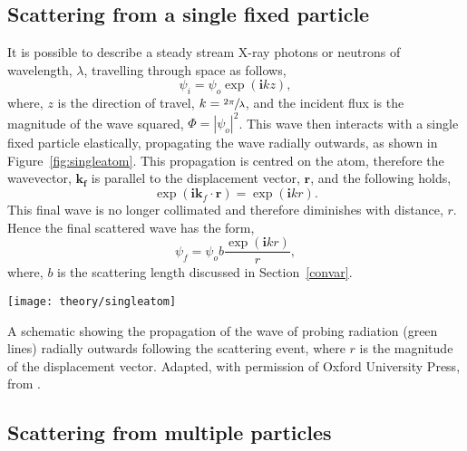 \subsection{Scattering from a single fixed particle}
It is possible to describe a steady stream X-ray photons or neutrons of wavelength, $\lambda$, travelling through space as follows,
%
\begin{equation}
    \psi_i = \psi_o \exp{(\mathbf{i} kz)},
    \label{equ:wave}
\end{equation}
%
where, $z$ is the direction of travel, $k=\sfrac{2\pi}{\lambda}$, and the incident flux is the magnitude of the wave squared, $\Phi = |\psi_o|^2$.
This wave then interacts with a single fixed particle elastically, propagating the wave radially outwards, as shown in Figure~\ref{fig:singleatom}.
This propagation is centred on the atom, therefore the wavevector, $\mathbf{k_f}$ is parallel to the displacement vector, $\mathbf{r}$, and the following holds,
%
\begin{equation}
    \exp{(\mathbf{i}\mathbf{k}_f\cdot \mathbf{r})} = \exp{(\mathbf{i}kr)}.
\end{equation}
%
This final wave is no longer collimated and therefore diminishes with distance, $r$.
Hence the final scattered wave has the form,
%
\begin{equation}
    \psi_f = \psi_o b\frac{\exp{(\mathbf{i}kr)}}{r},
\end{equation}
%
where, $b$ is the scattering length discussed in Section~\ref{convar}.
%
\begin{marginfigure}
    \centering
    \texttt{[image: theory/singleatom]}
    \caption{A schematic showing the propagation of the wave of probing radiation (green lines) radially outwards following the scattering event, where $r$ is the magnitude of the displacement vector. Adapted, with permission of Oxford University Press, from \cite{sivia_elementary_2011}.}
    \label{fig:singleatom}
\end{marginfigure}
%

\subsection{Scattering from multiple particles}
\label{sec:multiscat}

